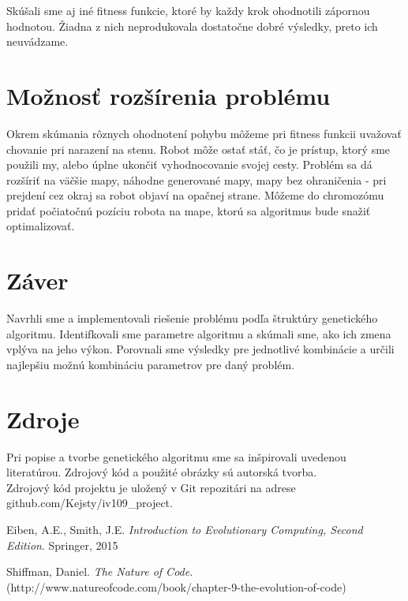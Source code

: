 \documentclass[10pt]{paper}
\begin{document}
Skúšali sme aj iné fitness funkcie, ktoré by každy krok ohodnotili zápornou hodnotou. Žiadna z nich neprodukovala dostatočne dobré výsledky, preto ich neuvádzame.

\section{Možnosť rozšírenia problému}

Okrem skúmania rôznych ohodnotení pohybu môžeme pri fitness funkcii uvažovať chovanie pri narazení na stenu. Robot môže ostať stáť, čo je prístup, ktorý sme použili my, alebo úplne ukončiť vyhodnocovanie svojej cesty. Problém sa dá rozšíriť na väčšie mapy, náhodne generované mapy, mapy bez ohraničenia - pri prejdení cez okraj sa robot objaví na opačnej strane. Môžeme do chromozómu pridať počiatočnú pozíciu robota na mape, ktorú sa algoritmus bude snažiť optimalizovať.

\section{Záver}

Navrhli sme a implementovali riešenie problému podľa štruktúry genetického algoritmu. Identifkovali sme parametre algoritmu a skúmali sme, ako ich zmena vplýva na jeho výkon. Porovnali sme výsledky pre jednotlivé kombinácie a určili najlepšiu možnú kombináciu parametrov pre daný problém.

\section{Zdroje}

Pri popise a tvorbe genetického algoritmu sme sa inšpirovali uvedenou literatúrou. Zdrojový kód a použité obrázky sú autorská tvorba.\\



Zdrojový kód projektu je uložený v Git repozitári na adrese github.com/Kejsty/iv109{\_}project.


\begin{thebibliography}{9}
	Eiben, A.E., Smith, J.E. 
	\textit{Introduction to Evolutionary Computing, Second Edition}. 
	Springer, 2015
	
	Shiffman, Daniel.
	\textit{The Nature of Code}. 
	\\(http://www.natureofcode.com/book/chapter-9-the-evolution-of-code)
	
\end{thebibliography}
\end{document}
